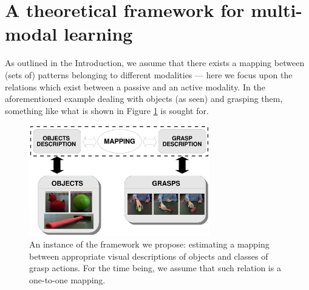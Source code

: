 \section{A theoretical framework for multi-modal learning}
\label{sec::framework}

As outlined in the Introduction, we assume that there exists a mapping between (sets of) patterns belonging to different modalities --- here we focus upon the relations which exist between a passive and an active modality. In the aforementioned example dealing with objects (as seen) and grasping them, something like what is shown in Figure \ref{fig::implementation} is sought for.

\begin{figure}[h!]
	\centering
	\includegraphics[width=0.7\textwidth]{images/schema_implementazione}
	\caption{An instance of the framework we propose: estimating a
     mapping between appropriate visual descriptions of objects and
     classes of grasp actions. For the time being, we assume that such
     relation is a one-to-one mapping.}
	\label{fig::implementation}
\end{figure}

